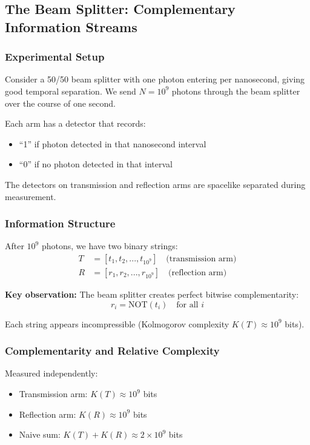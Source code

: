 ﻿\documentclass[12pt]{article}
\begin{document}
\subsection{The Beam Splitter: Complementary Information Streams}


\subsubsection{Experimental Setup}


Consider a 50/50 beam splitter with one photon entering per nanosecond, 
giving good temporal separation. We send $N = 10^9$ photons through the 
beam splitter over the course of one second.


Each arm has a detector that records:
\begin{itemize}
    \item ``1'' if photon detected in that nanosecond interval
    \item ``0'' if no photon detected in that interval  
\end{itemize}


The detectors on transmission and reflection arms are spacelike separated 
during measurement.


\subsubsection{Information Structure}


After $10^9$ photons, we have two binary strings:
\begin{align}
    T &= [t_1, t_2, ..., t_{10^9}] \quad \text{(transmission arm)} \\
    R &= [r_1, r_2, ..., r_{10^9}] \quad \text{(reflection arm)}
\end{align}


\textbf{Key observation:} The beam splitter creates perfect bitwise complementarity:
\begin{equation}
    r_i = \text{NOT}(t_i) \quad \text{for all } i
\end{equation}


Each string appears incompressible (Kolmogorov complexity $K(T) \approx 10^9$ bits).


\subsubsection{Complementarity and Relative Complexity}


Measured independently:
\begin{itemize}
    \item Transmission arm: $K(T) \approx 10^9$ bits
    \item Reflection arm: $K(R) \approx 10^9$ bits  
    \item Naive sum: $K(T) + K(R) \approx 2 \times 10^9$ bits
\end{itemize}
\end{document}
